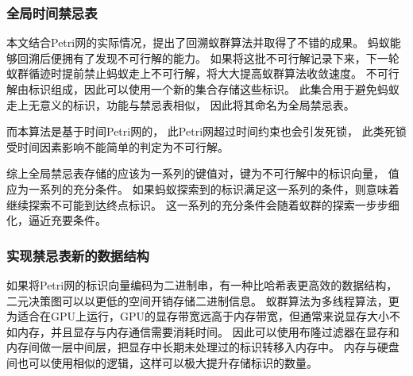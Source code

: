 \subsubsection{全局时间禁忌表}
本文结合Petri网的实际情况，提出了回溯蚁群算法并取得了不错的成果。
蚂蚁能够回溯后便拥有了发现不可行解的能力。
如果将这批不可行解记录下来，下一轮蚁群循迹时提前禁止蚂蚁走上不可行解，将大大提高蚁群算法收敛速度。
不可行解由标识组成，因此可以使用一个新的集合存储这些标识。
此集合用于避免蚂蚁走上无意义的标识，功能与禁忌表相似，
因此将其命名为全局禁忌表。

而本算法是基于时间Petri网的，
此Petri网超过时间约束也会引发死锁，
此类死锁受时间因素影响不能简单的判定为不可行解。

综上全局禁忌表存储的应该为一系列的键值对，键为不可行解中的标识向量，
值应为一系列的充分条件。
如果蚂蚁探索到的标识满足这一系列的条件，则意味着继续探索不可能到达终点标识。
这一系列的充分条件会随着蚁群的探索一步步细化，逼近充要条件。
\subsubsection{实现禁忌表新的数据结构}
如果将Petri网的标识向量编码为二进制串，有一种比哈希表更高效的数据结构，二元决策图可以以更低的空间开销存储二进制信息。
蚁群算法为多线程算法，更为适合在GPU上运行，GPU的显存带宽远高于内存带宽，但通常来说显存大小不如内存，并且显存与内存通信需要消耗时间。
因此可以使用布隆过滤器在显存和内存间做一层中间层，把显存中长期未处理过的标识转移入内存中。
内存与硬盘间也可以使用相似的逻辑，这样可以极大提升存储标识的数量。